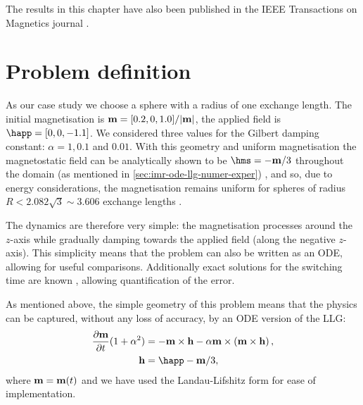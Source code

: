 The results in this chapter have also been published in the IEEE Transactions on Magnetics journal \cite{Shepherd2014}.


\section{Problem definition}

As our case study we choose a sphere with a radius of one exchange length.
The initial magnetisation is $\boldsymbol{\mathrm{m}} = [0.2, 0, 1.0]/|\boldsymbol{\mathrm{m}}|$, the applied field is $\happ =[0, 0, -1.1]$.
We considered three values for the Gilbert damping constant: $\alpha = 1, 0.1$ and $0.01$.
With this geometry and uniform magnetisation the magnetostatic field can be analytically shown to be $\hms = -\mv/3$ throughout the domain (as mentioned in \cref{sec:imr-ode-llg-numer-exper}) \cite[112]{Aharoni1996}, and so, due to energy considerations, the magnetisation remains uniform for spheres of radius $R < 2.082 \sqrt{3} \sim 3.606$ exchange lengths \cite[211]{HubertSchafer}.

The dynamics are therefore very simple: the magnetisation processes around the $z$-axis while gradually damping towards the applied field (along the negative $z$-axis).
This simplicity means that the problem can also be written as an ODE, allowing for useful comparisons.
Additionally exact solutions for the switching time are known \cite{Mallinson2000}, allowing quantification of the error.


As mentioned above, the simple geometry of this problem means that the physics can be captured, without any loss of accuracy, by an ODE version of the LLG:
\begin{equation}
  \label{eq:ode-llg}
  \begin{aligned}
    \dmdt (1 + \dampc^2) &= - \mv \times \hv - \dampc \mv \times \left( \mv \times \hv \right), \\
    \hv &= \happ - \mv/3,
  \end{aligned}
\end{equation}
where $\boldsymbol{\mathrm{m}} = \boldsymbol{\mathrm{m}}(t)$ and we have used the Landau-Lifshitz form for ease of implementation.


